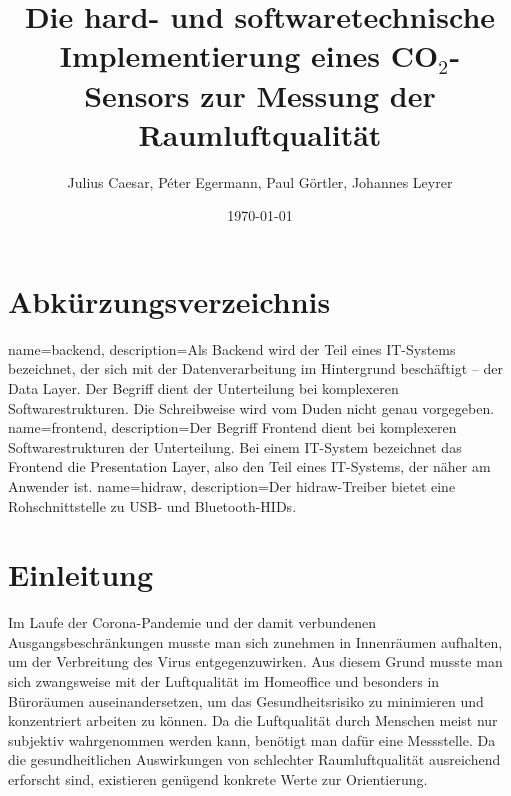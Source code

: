 \documentclass[a4paper,
    11pt,
    headings=small,
    ngerman,
    listof=totoc,
    numbers=noenddot]{scrreprt}[2021/11/13]
\title{Die hard- und softwaretechnische Implementierung eines CO$_2$-Sensors zur Messung der Raumluftqualität}
\author{Julius Caesar, Péter Egermann, Paul Görtler, Johannes Leyrer}
\date{\today}
\begin{document}
\maketitle

\newpage

\tableofcontents

\newpage

\chapter*{Abkürzungsverzeichnis}

\begin{acronym}[DGUV]
\end{acronym}

{
  name=backend,
  description={Als Backend wird der Teil eines IT-Systems bezeichnet, der sich mit der Datenverarbeitung im Hintergrund beschäftigt – der Data Layer. Der Begriff dient der Unterteilung bei komplexeren Softwarestrukturen. Die Schreibweise wird vom Duden nicht genau vorgegeben. \autocite{backend_definition}}
}
{
  name=frontend,
  description={Der Begriff Frontend dient bei komplexeren Softwarestrukturen der Unterteilung. Bei einem IT-System bezeichnet das Frontend die Presentation Layer, also den Teil eines IT-Systems, der näher am Anwender ist. \autocite{frontend_definition}}
}
{
  name=hidraw,
  description={Der hidraw-Treiber bietet eine Rohschnittstelle zu USB- und Bluetooth-\ac{HIDs}.}
}

\newpage


\chapter{Einleitung}

Im Laufe der Corona-Pandemie und der damit verbundenen Ausgangsbeschränkungen musste man sich zunehmen in Innenräumen aufhalten, um der Verbreitung des Virus entgegenzuwirken. Aus diesem Grund musste man sich zwangsweise mit der Luftqualität im Homeoffice und besonders in Büroräumen auseinandersetzen, um das Gesundheitsrisiko zu minimieren und konzentriert arbeiten zu können. Da die Luftqualität durch Menschen meist nur subjektiv wahrgenommen werden kann, benötigt man dafür eine Messstelle. Da die gesundheitlichen Auswirkungen von schlechter Raumluftqualität ausreichend erforscht sind, existieren genügend konkrete Werte zur Orientierung.
\end{document}
